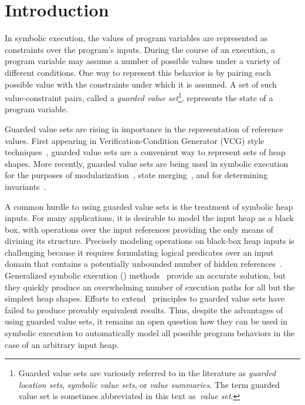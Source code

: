 \section{Introduction}




%

In symbolic execution, the values of program variables are represented as constraints over the program's inputs. During the course of an execution, a program variable may assume a number of possible values under a variety of different conditions. One way to represent this behavior is by pairing each possible value with the constraints under which it is assumed. A set of such value-constraint pairs, called a \emph{guarded value set}\footnote{Guarded value sets are variously referred to in the literature as \emph{guarded location sets}, \emph{symbolic value sets}, or \emph{value summaries}. The term guarded value set is sometimes abbreviated in this text as~\emph{value set}.}, represents the state of a program variable.

Guarded value sets are rising in importance in the representation of reference values. First appearing in Verification-Condition Generator (VCG) style techniques~\cite{Xie:2005,Dillig:2011}, guarded value sets are a convenient way to represent sets of heap shapes. More recently, guarded value sets are being used in symbolic execution for the purposes of modularization~\cite{Yorsh:2008}, state merging~\cite{Sen:2014}, and for determining invariants~\cite{Ferrara:2014,Torlak:2014}.

A common hurdle to using guarded value sets is the treatment of symbolic heap inputs. For many applications, it is desirable to model the input heap as a black box, with operations over the input references providing the only means of divining its structure. Precisely modeling operations on black-box heap inputs is challenging because it requires formulating logical predicates over an input domain that contains a potentially unbounded number of hidden references~\cite{Chen:2013,Qu:2011}. Generalized symbolic execution (\gsetxt{}) methods~\cite{GSE03,Deng:2007} provide an accurate solution, but they quickly produce an overwhelming number of execution paths for all but the simplest heap shapes. Efforts to extend~\gsetxt{} principles to guarded value sets have failed to produce provably equivalent results. Thus, despite the advantages of using guarded value sets, it remains an open question how they can be used in symbolic execution to automatically model all possible program behaviors in the case of an arbitrary input heap.

